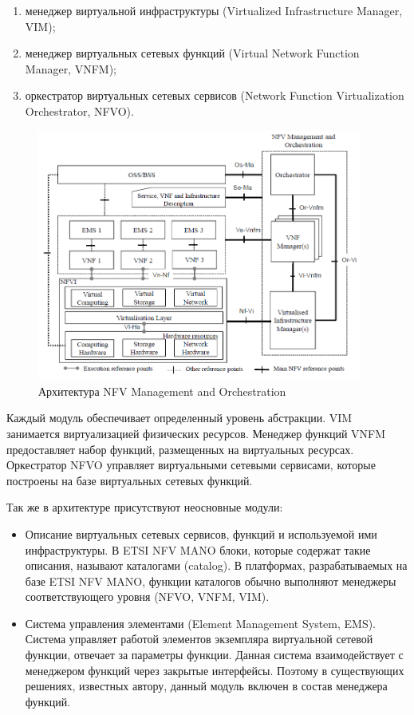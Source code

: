 \documentclass[oneside,final,14pt,a4paper]{extreport}
\begin{document}
\begin{enumerate}
	\item менеджер виртуальной инфраструктуры (Virtualized Infrastructure Manager, VIM);
	\item менеджер виртуальных сетевых функций (Virtual Network Function Manager, VNFM);
	\item оркестратор виртуальных сетевых сервисов (Network Function Virtualization Orchestrator, NFVO).
\end{enumerate}

\begin{figure}[h]
	\centering
	\includegraphics[width=0.95\textwidth]{nfv-mano}
	\caption{Архитектура NFV Management and Orchestration}
	\label{nfv-mano-image1}
\end{figure}

Каждый модуль обеспечивает определенный уровень абстракции. VIM занимается виртуализацией физических ресурсов. Менеджер функций VNFM предоставляет набор функций, размещенных на виртуальных ресурсах. Оркестратор NFVO управляет виртуальными сетевыми сервисами, которые построены на базе виртуальных сетевых функций.

Так же в архитектуре присутствуют неосновные модули:
\begin{itemize}
	\item Описание виртуальных сетевых сервисов, функций и используемой ими инфраструктуры. В ETSI NFV MANO блоки, которые содержат такие описания, называют каталогами (catalog). В платформах, разрабатываемых на базе ETSI NFV MANO, функции каталогов обычно выполняют менеджеры соответствующего уровня (NFVO, VNFM, VIM).
	\item Система управления элементами (Element Management System, EMS). Система управляет работой элементов экземпляра виртуальной сетевой функции, отвечает за параметры функции. Данная система взаимодействует с менеджером функций через закрытые интерфейсы. Поэтому в существующих решениях, известных автору, данный модуль включен в состав менеджера функций.
\end{itemize}
\end{document}
